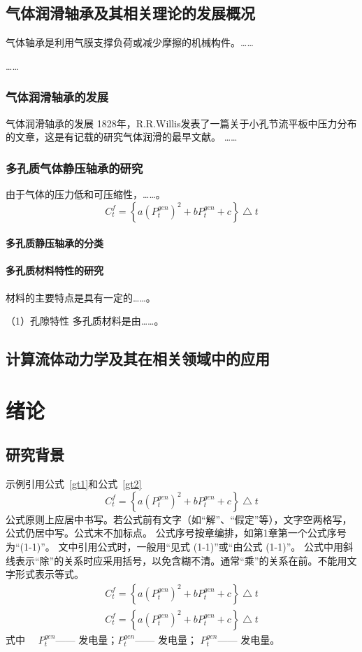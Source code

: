\documentclass[a4paper, twoside, openany]{NCEPUMaster_Original}
\begin{document}
\section{气体润滑轴承及其相关理论的发展概况} %
气体轴承是利用气膜支撑负荷或减少摩擦的机械构件。……

…… 
\subsection{气体润滑轴承的发展} %

气体润滑轴承的发展
1828年，R.R.Willis发表了一篇关于小孔节流平板中压力分布的文章，这是有记载的研究气体润滑的最早文献。
…… 
\subsection{多孔质气体静压轴承的研究} 
由于气体的压力低和可压缩性，……。
\begin{equation}
\label{gt1}
 C^f_t=\left \{a(P_t^{gen})^2 + b P_t^{gen}+c\right \} \bigtriangleup t
\end{equation}
\subsubsection{多孔质静压轴承的分类}


\subsubsection{多孔质材料特性的研究}
材料的主要特点是具有一定的……。

{\Heiti （1）孔隙特性} 多孔质材料是由……。



\section{计算流体动力学及其在相关领域中的应用}
\chapter{绪论}

\section{研究背景}
示例引用公式~\ref{gt1}和公式~\ref{gt2}
\begin{equation}
 C^f_t=\left \{a(P_t^{gen})^2 + b P_t^{gen}+c\right \} \bigtriangleup t
 \label{gt1}
\end{equation}
公式原则上应居中书写。若公式前有文字（如“解”、“假定”等），文字空两格写，公式仍居中写。公式末不加标点。
公式序号按章编排，如第1章第一个公式序号为“(1-1)”。
文中引用公式时，一般用“见式 (1-1)”或“由公式 (1-1)”。
公式中用斜线表示“除”的关系时应采用括号，以免含糊不清。通常“乘”的关系在前。不能用文字形式表示等式。
\begin{gather}
    C^f_t=\left \{a(P_t^{gen})^2 + b P_t^{gen}+c\right \} \bigtriangleup t \label{gt2} \\
    C^f_t=\left \{a(P_t^{gen})^2 + b P_t^{gen}+c\right \} \bigtriangleup t \label{gt3}
\end{gather}
式中~~  $P_t^{gen}$------ 发电量；\breakwithtilde $P_t^{gen}$------ 发电量；
\breakwithtilde $P_t^{gen}$------ 发电量。
\end{document}
